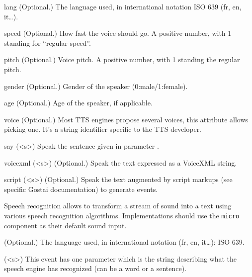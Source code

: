 \begin{urbiscriptapi}
\item[lang] (Optional.) The language used, in international notation ISO 639
  (fr, en, it\ldots).

\item[speed] (Optional.) How fast the voice should go.  A positive number,
  with 1 standing for ``regular speed''.

\item[pitch] (Optional.) Voice pitch.  A positive number, with 1 standing
  the regular pitch.

\item[gender] (Optional.) Gender of the speaker (0:male/1:female).

\item[age] (Optional.) Age of the speaker, if applicable.

\item[voice] (Optional.) Most TTS engines propose several voices, this
  attribute allows picking one. It's a string identifier specific to the TTS
  developer.

\item[say](<s>) Speak the sentence given in parameter .

\item[voicexml](<s>) (Optional.) Speak the text  expressed as a
  VoiceXML string.

\item[script](<s>) (Optional.) Speak the text  augmented by script
  markups (see specific Gostai documentation) to generate \urbi events.
\end{urbiscriptapi}



Speech recognition allows to transform a stream of sound into a text
using various speech recognition algorithms. Implementations
should use the \lstinline{micro} component as their default sound input.

\begin{urbiscriptapi}
\item[lang] (Optional.)  The language used, in international notation (fr,
  en, it…): ISO 639.
\item[hear](<s>) This event has one parameter which is the string describing
  what the speech engine has recognized (can be a word or a sentence).
\end{urbiscriptapi}


